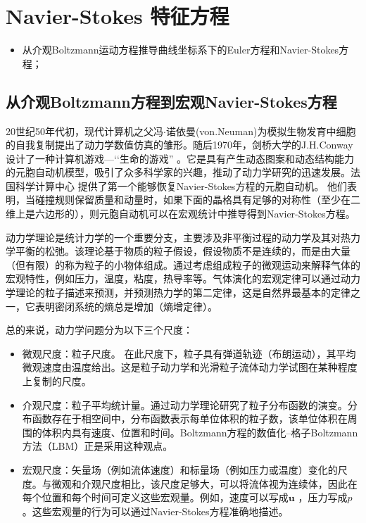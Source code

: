 \documentclass[LBMDerivation.tex]{subfiles}
\begin{document}


\chapter{Navier-Stokes 特征方程 }
\label{CHAPTER::Characteristic}

%
%
%
\begin{itemize}
  \item 从介观Boltzmann运动方程推导曲线坐标系下的Euler方程和Navier-Stokes方程；
\end{itemize}



\section{从介观Boltzmann方程到宏观Navier-Stokes方程}


20世纪50年代初，现代计算机之父冯$\cdot$诺依曼(von.Neuman)为模拟生物发育中细胞的自我复制提出了动力学数值仿真的雏形。随后1970年，剑桥大学的J.H.Conway设计了一种计算机游戏—‘‘生命的游戏” 。它是具有产生动态图案和动态结构能力的元胞自动机模型，吸引了众多科学家的兴趣，推动了动力学研究的迅速发展。法国科学计算中心 \cite{frisch1986lattice}提供了第一个能够恢复Navier-Stokes方程的元胞自动机。 他们表明，当碰撞规则保留质量和动量时，如果下面的晶格具有足够的对称性（至少在二维上是六边形的），则元胞自动机可以在宏观统计中推导得到Navier-Stokes方程。

动力学理论是统计力学的一个重要分支，主要涉及非平衡过程的动力学及其对热力学平衡的松弛。该理论基于物质的粒子假设，假设物质不是连续的，而是由大量（但有限）的称为粒子的小物体组成。通过考虑组成粒子的微观运动来解释气体的宏观特性，例如压力，温度，粘度，热导率等。气体演化的宏观定律可以通过动力学理论的粒子描述来预测，并预测热力学的第二定律，这是自然界最基本的定律之一，它表明密闭系统的熵总是增加（熵增定律）。


总的来说，动力学问题分为以下三个尺度：
\begin{itemize}
  \item  微观尺度：粒子尺度。 在此尺度下，粒子具有弹道轨迹（布朗运动），其平均微观速度由温度给出。这是粒子动力学和光滑粒子流体动力学试图在某种程度上复制的尺度。

  \item 介观尺度：粒子平均统计量。通过动力学理论研究了粒子分布函数的演变。分布函数存在于相空间中，分布函数表示每单位体积的粒子数，该单位体积在周围的体积内具有速度、位置和时间。Boltzmann方程的数值化--格子Boltzmann方法（LBM）正是采用这种观点。

  \item  宏观尺度：矢量场（例如流体速度）和标量场（例如压力或温度）变化的尺度。与微观和介观尺度相比，该尺度足够大，可以将流体视为连续体，因此在每个位置和每个时间可定义这些宏观量。例如，速度可以写成$\boldsymbol{u}$ ，压力写成$p$。这些宏观量的行为可以通过Navier-Stokes方程准确地描述。
\end{itemize}
\end{document}
